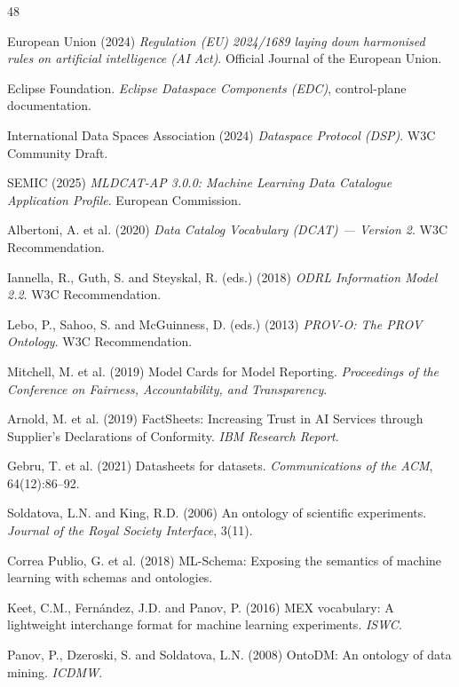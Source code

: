 \documentclass[Afour,sagev,times]{sagej}
\begin{document}
\begin{thebibliography}{48}

 European Union (2024) \emph{Regulation (EU) 2024/1689 laying down harmonised rules on artificial intelligence (AI Act)}. Official Journal of the European Union.

 Eclipse Foundation. \emph{Eclipse Dataspace Components (EDC)}, control-plane documentation.

 International Data Spaces Association (2024) \emph{Dataspace Protocol (DSP)}. W3C Community Draft.

 SEMIC (2025) \emph{MLDCAT-AP 3.0.0: Machine Learning Data Catalogue Application Profile}. European Commission.

 Albertoni, A. et al. (2020) \emph{Data Catalog Vocabulary (DCAT) --- Version 2}. W3C Recommendation.

 Iannella, R., Guth, S. and Steyskal, R. (eds.) (2018) \emph{ODRL Information Model 2.2}. W3C Recommendation.

 Lebo, P., Sahoo, S. and McGuinness, D. (eds.) (2013) \emph{PROV-O: The PROV Ontology}. W3C Recommendation.

 Mitchell, M. et al. (2019) Model Cards for Model Reporting. \emph{Proceedings of the Conference on Fairness, Accountability, and Transparency}.

 Arnold, M. et al. (2019) FactSheets: Increasing Trust in AI Services through Supplier's Declarations of Conformity. \emph{IBM Research Report}.

 Gebru, T. et al. (2021) Datasheets for datasets. \emph{Communications of the ACM}, 64(12):86--92.

 Soldatova, L.N. and King, R.D. (2006) An ontology of scientific experiments. \emph{Journal of the Royal Society Interface}, 3(11).

 Correa Publio, G. et al. (2018) ML-Schema: Exposing the semantics of machine learning with schemas and ontologies.

 Keet, C.M., Fernández, J.D. and Panov, P. (2016) MEX vocabulary: A lightweight interchange format for machine learning experiments. \emph{ISWC}.

 Panov, P., Dzeroski, S. and Soldatova, L.N. (2008) OntoDM: An ontology of data mining. \emph{ICDMW}.


\end{thebibliography}
\end{document}
